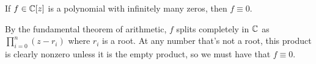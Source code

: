 \documentclass{homework}
\begin{document}
                                                                                                                    \begin{problem}\label{identity-theorem}If $f \in \mathbb{C}[z]$ is a polynomial with infinitely many zeros, then
                                                                                                                        $f \equiv 0$.
                                                                                                                          \end{problem}
                                                                                                                           \begin{solution}
                                                                                                                            By the fundamental theorem of arithmetic, $f$ splits completely in $\mathbb{C}$ as $\prod_{i=0}^n (z - r_i)$ where $r_i$ is a root. At any number that's not a root, this product is clearly nonzero unless it is the empty product, so we must have that $f\equiv 0$.
                                                                                                                             \end{solution} 
                                                                                                                             
\end{document}
